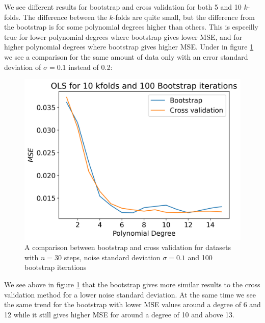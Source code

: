 \documentclass[12pt]{article}
\begin{document}
We see different results for bootstrap and cross validation for both 5 and 10 $k$-folds. The difference between the $k$-folds are quite small, but the difference from the bootstrap is for some polynomial degrees higher than others. This is espceilly true for lower polynomial degrees where bootstrap gives lower MSE, and for higher polynomial degrees where bootstrap gives higher MSE. Under in figure \ref{fig:cv_comp_01} we see a comparison for the same amount of data only with an error standard deviation of $\sigma=0.1$ instead of 0.2:
\begin{figure}[H]
  \centering
  \includegraphics[width=.7\textwidth]{../figures/boot_cv_comp_01.png}
  \caption{A comparison between bootstrap and cross validation for datasets with $n=30$ steps, noise standard deviation $\sigma=0.1$ and 100 bootstrap iterations}
  \label{fig:cv_comp_01}
\end{figure}
We see above in figure \ref{fig:cv_comp_01} that the bootstrap gives more similar results to the cross validation method for a lower noise standard deviation. At the same time we see the same trend for the bootstrap with lower MSE values around a degree of 6 and 12 while it still gives higher MSE for around a degree of 10 and above 13.
\end{document}
